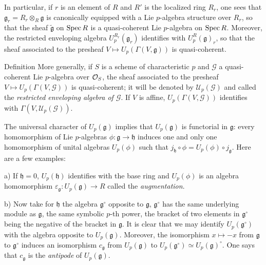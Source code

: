 \par
In particular, if $r$ is an element of $R$ and $R'$ is the localized ring $R_r$, one sees that $\mathfrak g_r=R_r\otimes_R\mathfrak g$ is canonically equipped with a Lie $p$-algebra structure over $R_r$, so that the sheaf $\widetilde{\mathfrak g}$ on $\operatorname{Spec} R$ is a quasi-coherent Lie $p$-algebra on $\operatorname{Spec} R$. Moreover, the restricted enveloping algebra $U_p^{R_r}(\mathfrak g_r)$ identifies with $U_p^R(\mathfrak g)_r$, so that the sheaf associated to the presheaf $V\mapsto U_p(\Gamma(V,\mathfrak g))$ is quasi-coherent.

\begin{enoncerm}{Definition}{}
More generally, if $S$ is a scheme of characteristic $p$ and $\mathscr G$ a quasi-coherent Lie $p$-algebra over $\mathcal{O}_S$, the sheaf associated to the presheaf $V\mapsto U_p(\Gamma(V,\mathscr G))$ is quasi-coherent; it will be denoted by $\mathscr U_p(\mathscr G)$ and called the \emph{restricted enveloping algebra of $\mathscr G$}. If $V$ is affine, $U_p(\Gamma(V,\mathscr G))$ identifies with $\Gamma(V,\mathscr U_p(\mathscr G))$.
\end{enoncerm}

The universal character of $U_p(\mathfrak g)$ implies that $U_p(\mathfrak g)$ is functorial in $\mathfrak g$: every homomorphism of Lie $p$-algebras $\phi:\mathfrak g\to\mathfrak h$ induces one and only one homomorphism of unital algebras $U_p(\phi)$ such that $j_{\mathfrak h}\circ\phi=U_p(\phi)\circ j_{\mathfrak g}$. Here are a few examples:

\noindent a) If $\mathfrak h=0$, $U_p(\mathfrak h)$ identifies with the base ring and $U_p(\phi)$ is an algebra homomorphism $\varepsilon_{\mathfrak g}:U_p(\mathfrak g)\to R$ called the \emph{augmentation}.

\noindent b) Now take for $\mathfrak h$ the algebra $\mathfrak g^\circ$ opposite to $\mathfrak g$, \ie $\mathfrak g^\circ$ has the same underlying module as $\mathfrak g$, the same symbolic $p$-th power, the bracket of two elements in $\mathfrak g^\circ$ being the negative of the bracket in $\mathfrak g$. It is clear that we may identify $U_p(\mathfrak g^\circ)$ with the algebra opposite to $U_p(\mathfrak g)$. Moreover, the isomorphism $x\mapsto-x$ from $\mathfrak g$ to $\mathfrak g^\circ$ induces an isomorphism $c_{\mathfrak g}$ from $U_p(\mathfrak g)$ to $U_p(\mathfrak g^\circ)\simeq U_p(\mathfrak g)^\circ$. One says that $c_{\mathfrak g}$ is the \emph{antipode} of $U_p(\mathfrak g)$.

